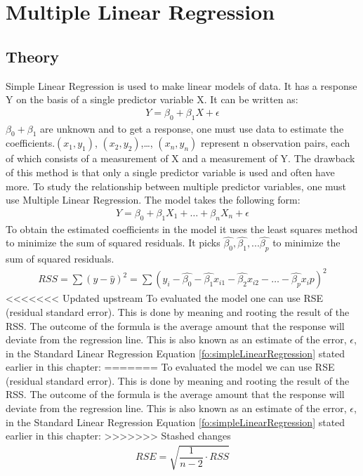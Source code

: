 \section{Multiple Linear Regression}\label{sc:multipleLinearRegression}

\subsection{Theory}
Simple Linear Regression is used to make linear models of data. It has a response Y on the basis of a single predictor variable X. It can be written as:
\begin{align}\label{fo:simpleLinearRegression}
Y = \beta_0 + \beta_1 X + \epsilon
\end{align}
$ \beta_0 + \beta_1 $ are unknown and to get a response, one must use data to estimate the coefficients.$(x_1, y_1)$, $(x_2, y_2)$,\dots, $(x_n, y_n)$ represent n observation pairs, each of which consists of a measurement of X and a measurement of Y. The drawback of this method is that only a single predictor variable is used and often have more. To study the relationship between multiple predictor variables, one must use Multiple Linear Regression. The model takes the following form:
\begin{align}\label{fo:multipleLinearRegression}
Y = \beta_0 + \beta_1 X_1 + \ldots + \beta_n X_n + \epsilon
\end{align}
To obtain the estimated coefficients in the model it uses the least squares method to minimize the sum of squared residuals. It picks $\hat{\beta_0}, \hat{\beta_1}, ... \hat{\beta_p}$ to minimize the sum of squared residuals.
\begin{align}\label{fo:rss}
RSS = \sum (y - \hat{y})^2 = \sum( y_i - \hat{\beta_0} - \hat{\beta_1}x_{i1} - \hat{\beta_2}x_{i2} - \ldots - \hat{\beta_p}x_\textit{i}p )^2
\end{align}
<<<<<<< Updated upstream
To evaluated the model one can use RSE (residual standard error). This is done by meaning and rooting the result of the RSS. The outcome of the formula is the average amount that the response will deviate from the regression line. This is also known as an estimate of the error, $\epsilon$, in the Standard Linear Regression Equation \ref{fo:simpleLinearRegression} stated earlier in this chapter:
=======
To evaluated the model we can use RSE (residual standard error). This is done by meaning and rooting the result of the RSS. The outcome of the formula is the average amount that the response will deviate from the regression line. This is also known as an estimate of the error, $\epsilon$, in the Standard Linear Regression Equation \ref{fo:simpleLinearRegression} stated earlier in this chapter:
>>>>>>> Stashed changes
\begin{align}\label{fo:rse}
RSE = \sqrt{\dfrac{1}{n-2}\cdot RSS}
\end{align}


